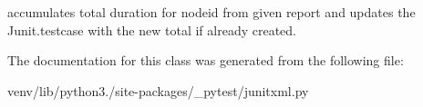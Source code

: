 \begin{DoxyVerb}accumulates total duration for nodeid from given report and updates
the Junit.testcase with the new total if already created.
\end{DoxyVerb}
 

The documentation for this class was generated from the following file\+:\begin{DoxyCompactItemize}
\item 
venv/lib/python3./site-\/packages/\+\_\+pytest/junitxml.\+py\end{DoxyCompactItemize}
